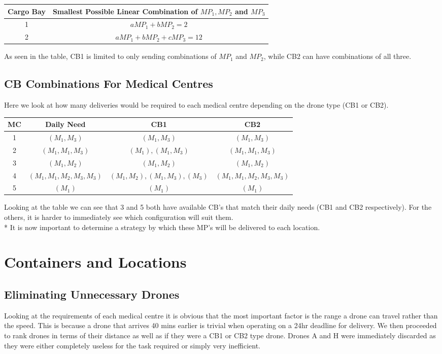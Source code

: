 \documentclass[a4paper,12pt]{article}
\begin{document}
\begin{center}
\begin{tabular}{ |c|c| }
 \hline
 Cargo Bay & Smallest Possible Linear Combination of $MP_1, MP_2$ and $MP_3$\\\hline
 1 & $aMP_1 + bMP_2 = 2$  \\
 2 & $aMP_1 + bMP_2 + cMP_3 = 12$ \\
 \hline
\end{tabular}
\end{center}

As seen in the table, CB1 is limited to only sending combinations of $MP_1$ and $MP_2$, while CB2 can have combinations of all three.

\subsection{CB Combinations For Medical Centres}
Here we look at how many deliveries would be required to each medical centre depending on the drone type (CB1 or CB2).
\begin{center}
\begin{tabular}{ |c|c|c|c| }
 \hline
 MC & Daily Need & CB1 & CB2 \\\hline
  1 & $(M_1,M_3)$ & $(M_1,M_3)$ & $(M_1,M_3)$  \\
  2 & $(M_1,M_1,M_3)$ & $(M_1),(M_1,M_3)$ & $(M_1,M_1,M_3)$  \\
  3 & $(M_1,M_2)$ & $(M_1,M_2)$ & $ (M_1,M_2)$  \\
  4 & $(M_1,M_1,M_2,M_3,M_3)$ & $(M_1,M_2),(M_1,M_3),(M_3)$ & $(M_1,M_1,M_2,M_3,M_3)$  \\
  5 & $(M_1)$ & $(M_1)$ & $(M_1)$  \\
\hline
\end{tabular}
\end{center}
Looking at the table we can see that 3 and 5 both have available CB's that match their daily needs (CB1 and CB2 respectively).
For the others, it is harder to immediately see which configuration will suit them.\\*
It is now important to determine a strategy by which these MP's will be delivered to each location.

\newpage

\section{Containers and Locations}
\subsection{Eliminating Unnecessary Drones}
Looking at the requirements of each medical centre it is obvious that the most important factor is the range a drone can travel rather than the speed.
This is because a drone that arrives 40 mins earlier is trivial when operating on a 24hr deadline for delivery.
We then proceeded to rank drones in terms of their distance as well as if they were a CB1 or CB2 type drone.
Drones A and H were immediately discarded as they were either completely useless for the task required or simply very inefficient.
\end{document}
